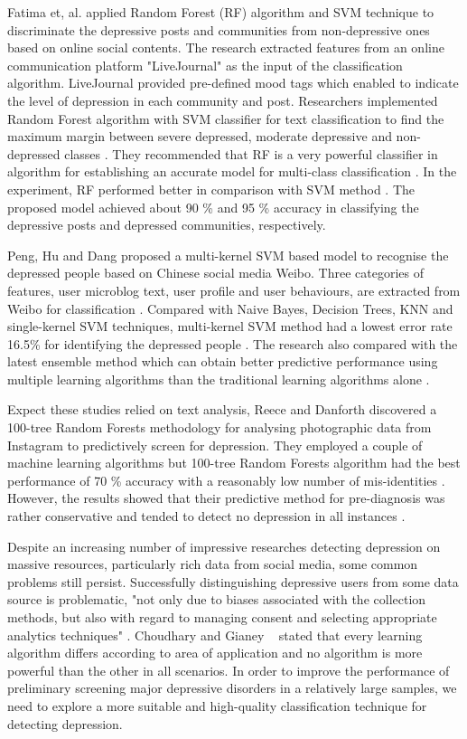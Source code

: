 \documentclass[10pt,journal,compsoc]{IEEEtran}
\begin{document}
Fatima et, al. \cite{Fatima} applied Random Forest (RF) algorithm and SVM technique to discriminate the depressive posts and communities from non-depressive ones based on online social contents. The research extracted features from an online communication platform "LiveJournal" as the input of the classification algorithm. LiveJournal provided pre-defined mood tags which enabled to indicate the level of depression in each community and post. Researchers implemented Random Forest algorithm with SVM classifier for text classification to find the maximum margin between severe depressed, moderate depressive and non-depressed classes \cite{Fatima}. They recommended that RF is a very powerful classifier in algorithm for establishing an accurate model for multi-class classification \cite{Fatima}. In the experiment, RF performed better in comparison with SVM method \cite{Fatima}. The proposed model achieved about 90 \% and 95 \% accuracy in classifying the depressive posts and depressed communities, respectively.

Peng, Hu and Dang \cite{Peng} proposed a multi-kernel SVM based model to recognise the depressed people based on Chinese social media Weibo. Three categories of features, user microblog text, user profile and user behaviours, are extracted from Weibo for classification \cite{Peng}. Compared with Naive Bayes, Decision Trees, KNN and single-kernel SVM techniques, multi-kernel SVM method had a lowest error rate 16.5\% for identifying the depressed people \cite{Peng}. The research also compared with the latest ensemble method which can obtain better predictive performance using multiple learning algorithms than the traditional learning algorithms alone \cite{Peng}.

Expect these studies relied on text analysis, Reece and Danforth discovered a 100-tree Random Forests methodology for analysing photographic data from Instagram to predictively screen for depression. They employed a couple of machine learning algorithms but 100-tree Random Forests algorithm had the best performance of 70 \% accuracy with a reasonably low number of mis-identities \cite{Reece}. However, the results showed that their predictive method for pre-diagnosis was rather conservative and tended to detect no depression in all instances \cite{Reece}. 

Despite an increasing number of impressive researches detecting depression on massive resources, particularly rich data from social media, some common problems still persist. Successfully distinguishing depressive users from some data source is problematic, "not only due to biases associated with the collection methods, but also with regard to managing consent and selecting appropriate analytics techniques" \cite{Wongkoblap}. Choudhary and Gianey ~\cite{Choudhary} stated that every learning algorithm differs according to area of application and no algorithm is more powerful than the other in all scenarios. In order to improve the performance of preliminary screening major depressive disorders in a relatively large samples, we need to explore a more suitable and high-quality classification technique for detecting depression.
%
%
%
%
%
\end{document}
